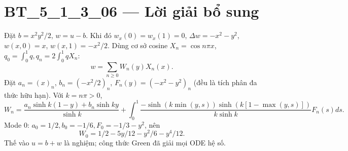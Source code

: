 \documentclass[10pt,a4paper]{article}
\begin{document}
\section*{BT\_5\_1\_3\_06 — Lời giải bổ sung}
Đặt $b=x^2y^2/2$, $w=u-b$. Khi đó $w_x(0)=w_x(1)=0$, $\Delta w=-x^2-y^2$, $w(x,0)=x$, $w(x,1)=-x^2/2$. Dùng cơ sở cosine $X_n=\cos n\pi x$, $q_0=\int_0^1q,q_n=2\int_0^1qX_n$:
\[w=\sum_{n\ge0}W_n(y)X_n(x).\]
Đặt $a_n=(x)_n$, $b_n=(-x^2/2)_n$, $F_n(y)=(-x^2-y^2)_n$ (đều là tích phân đa thức hữu hạn). Với $k=n\pi>0$,
\[W_n=\frac{a_n\sinh k(1-y)+b_n\sinh ky}{\sinh k}+\int_0^1\frac{-\sinh(k\min(y,s))\sinh(k[1-\max(y,s)])}{k\sinh k}F_n(s)ds.\]
Mode 0: $a_0=1/2,b_0=-1/6,F_0=-1/3-y^2$, nên
\[W_0=1/2-5y/12-y^2/6-y^4/12.\]
Thế vào $u=b+w$ là nghiệm; công thức Green đã giải mọi ODE hệ số.
\end{document}
